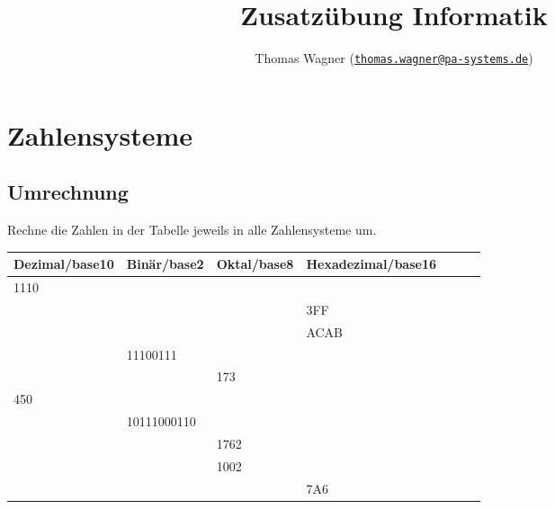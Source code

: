 \documentclass[]{scrartcl}
\title{Zusatzübung Informatik}
\author{Thomas Wagner (\href{mailto:thomas.wagner@pa-systems.de}{\texttt{thomas.wagner@pa-systems.de}})}
\begin{document}
\lstset{style=CStyle}

\maketitle

\section{Zahlensysteme}

\subsection{Umrechnung}
Rechne die Zahlen in der Tabelle jeweils in alle Zahlensysteme um.

\begin{table}[h!]
	\centering
	\begin{tabular}{l|l|l|llll}
		\multicolumn{1}{c|}{\textbf{Dezimal/base10}} &
		\multicolumn{1}{c|}{\textbf{Binär/base2}} &
		\multicolumn{1}{c|}{\textbf{Oktal/base8}} &
		\multicolumn{1}{c}{\textbf{Hexadezimal/base16}} &
		\multicolumn{1}{c}{\textbf{}} &
		\multicolumn{1}{c}{\textbf{}} &
		\multicolumn{1}{c}{\textbf{}} \\ \hline
		1110 &             &      &      &  &  &  \\ \hline
		     &             &      & 3FF  &  &  &  \\ \hline
		  	 &             &      & ACAB &  &  &  \\ \hline
		     & 11100111    &      &      &  &  &  \\ \hline
		     &             & 173  &      &  &  &  \\ \hline
		450  &             &      &      &  &  &  \\ \hline
		     & 10111000110 &      &      &  &  &  \\ \hline
		     &             & 1762 &      &  &  &  \\ \hline
		     &             & 1002 &      &  &  &  \\ \hline
		     &             &      & 7A6  &  &  &
	\end{tabular}
\end{table}
\end{document}
